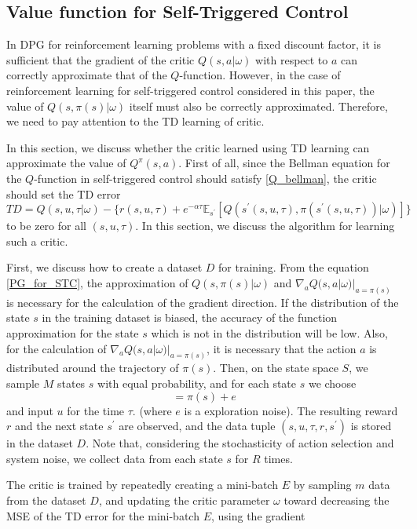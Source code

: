 \documentclass[english, dvipdfmx]{ampmt}             %
\newcommand{\expect}{\mathbb{E}}
\begin{document}
\subsection{Value function for Self-Triggered Control}
In DPG for reinforcement learning problems with a fixed discount factor, it is sufficient that the gradient of the critic $Q(s,a|\omega)$ with respect to $a$ can correctly approximate that of the $Q$-function. However, in the case of reinforcement learning for self-triggered control considered in this paper, the value of $Q(s,\pi(s)|\omega)$ itself must also be correctly approximated. Therefore, we need to pay attention to the TD learning of critic.\par
In this section, we discuss whether the critic learned using TD learning can approximate the value of $Q^{\pi}(s,a)$. First of all, since the Bellman equation for the $Q$-function in self-triggered control should satisfy \eqref{Q_bellman}, the critic should set the TD error
\begin{equation}
	TD = Q(s,u,\tau|\omega) - \{r(s,u,\tau) + e^{-\alpha\tau}\expect_{s^{\prime}}[Q(s^{\prime}(s,u,\tau), \pi(s^{\prime}(s,u,\tau))|\omega)]\}
\end{equation}
to be zero for all $(s,u,\tau)$. In this section, we discuss the algorithm for learning such a critic.\par
First, we discuss how to create a dataset $D$ for training. From the equation \eqref{PG_for_STC}, the approximation of $Q(s, \pi(s)|\omega)$ and $\nabla_aQ(s,a|\omega)|_{a=\pi(s)}$ is necessary for the calculation of the gradient direction. If the distribution of the state $s$ in the training dataset is biased, the accuracy of the function approximation for the state $s$ which is not in the distribution will be low. Also, for the calculation of $\nabla_aQ(s,a|\omega)|_{a=\pi(s)}$, it is necessary that the action $a$ is distributed around the trajectory of $\pi(s)$. Then, on the state space $S$, we sample $M$ states $s$ with equal probability, and for each state $s$ we choose 
\begin{equation}
	[u, \tau] = \pi(s) + e
\end{equation}
and input $u$ for the time $\tau$. (where $e$ is a exploration noise). The resulting reward $r$ and the next state $s^{\prime}$ are observed, and the data tuple $(s,u,\tau,r,s^{\prime})$ is stored in the dataset $D$. Note that, considering the stochasticity of action selection and system noise, we collect data from each state $s$ for $R$ times.\par
The critic is trained by repeatedly creating a mini-batch $E$ by sampling $m$ data from the dataset $D$, and updating the critic parameter $\omega$ toward decreasing the MSE of the TD error for the mini-batch $E$, using the gradient
\end{document}
